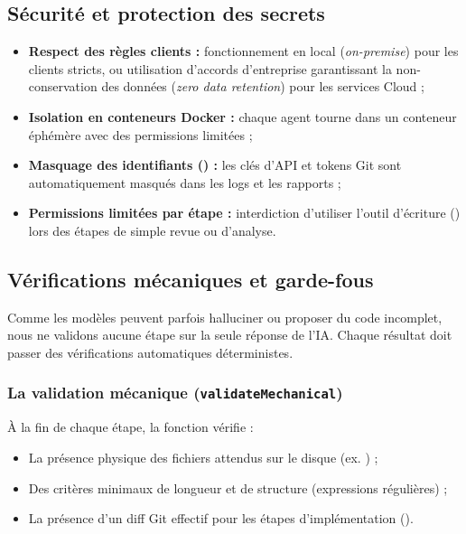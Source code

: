 \documentclass{tnreport}
\begin{document}
\subsection{Sécurité et protection des secrets}
\label{subsec:securite_secrets}

\begin{itemize}
    \item \textbf{Respect des règles clients :} fonctionnement en local (\textit{on-premise}) pour les clients stricts, ou utilisation d'accords d'entreprise garantissant la non-conservation des données (\textit{zero data retention}) pour les services Cloud ;
    \item \textbf{Isolation en conteneurs Docker :} chaque agent tourne dans un conteneur éphémère avec des permissions limitées ;
    \item \textbf{Masquage des identifiants () :} les clés d'API et tokens Git sont automatiquement masqués dans les logs et les rapports ;
    \item \textbf{Permissions limitées par étape :} interdiction d'utiliser l'outil d'écriture () lors des étapes de simple revue ou d'analyse.
\end{itemize}

\subsection{Vérifications mécaniques et garde-fous}
\label{subsec:gardefous_mecaniques}

Comme les modèles peuvent parfois halluciner ou proposer du code incomplet, nous ne validons aucune étape sur la seule réponse de l'IA. Chaque résultat doit passer des vérifications automatiques déterministes.

\subsubsection{La validation mécanique (\texttt{validateMechanical})}
À la fin de chaque étape, la fonction  vérifie :
\begin{itemize}
    \item La présence physique des fichiers attendus sur le disque (ex. ) ;
    \item Des critères minimaux de longueur et de structure (expressions régulières) ;
    \item La présence d'un diff Git effectif pour les étapes d'implémentation ().
\end{itemize}
\end{document}
